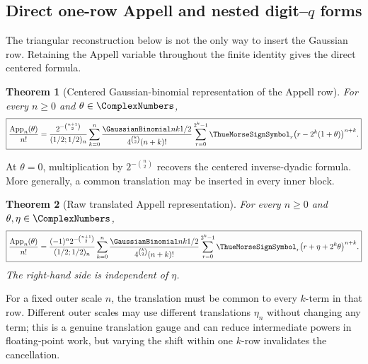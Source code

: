 \documentclass[11pt,oneside]{article}
\newtheorem{theorem}{Theorem}[section]
\theoremstyle{definition}
\theoremstyle{remark}
\begin{document}
\subsection{Direct one-row Appell and nested digit--\texorpdfstring{$q$}{q} forms}

The triangular reconstruction below is not the only way to insert the Gaussian row.  Retaining
the Appell variable throughout the finite identity gives the direct centered formula.
\begin{theorem}[Centered Gaussian-binomial representation of the Appell row]
\label{dyadicq:thm:centered-q-Appell}
For every $n\ge0$ and $\theta\in\ComplexNumbers$,
\begin{equation}
 \boxed{
 \frac{\operatorname{App}_n(\theta)}{n!}
 =\frac{2^{-\binom{n+1}{2}}}{(1/2;1/2)_n}
 \sum_{k=0}^{n}\frac{\GaussianBinomial nk{1/2}}{4^{\binom k2}(n+k)!}
 \sum_{r=0}^{2^k-1}\ThueMorseSignSymbol_r\bigl(r-2^k(1+\theta)\bigr)^{n+k}.}
 \label{dyadicq:eq:centered-q-Appell}
\end{equation}
\end{theorem}
At $\theta=0$, multiplication by $2^{-\binom n2}$ recovers the centered inverse-dyadic
formula.  More generally, a common translation may be inserted in every inner block.
\begin{theorem}[Raw translated Appell representation]
\label{dyadicq:thm:raw-q-Appell}
For every $n\ge0$ and $\theta,\eta\in\ComplexNumbers$,
\begin{equation}
 \boxed{
 \frac{\operatorname{App}_n(\theta)}{n!}
 =\frac{(-1)^n2^{-\binom{n+1}{2}}}{(1/2;1/2)_n}
 \sum_{k=0}^{n}\frac{\GaussianBinomial nk{1/2}}{4^{\binom k2}(n+k)!}
 \sum_{r=0}^{2^k-1}\ThueMorseSignSymbol_r\bigl(r+\eta+2^k\theta\bigr)^{n+k}.}
 \label{dyadicq:eq:raw-q-Appell}
\end{equation}
The right-hand side is independent of $\eta$.
\end{theorem}

For a fixed outer scale $n$, the translation must be common to every $k$-term in that row.
Different outer scales may use different translations $\eta_n$ without changing any term;
this is a genuine translation gauge and can reduce intermediate powers in floating-point
work, but varying the shift within one $k$-row invalidates the cancellation.
\end{document}
